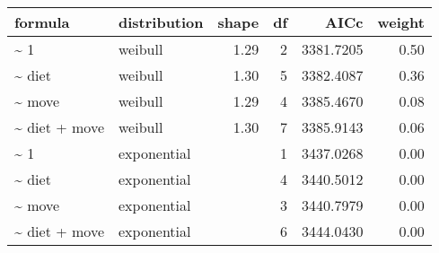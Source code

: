 \begin{table}[ht]
\centering
\begin{tabular}{llrrrr}
 formula & distribution & shape & df & AICc & weight \\ 
  \hline
\~{} 1 & weibull & 1.29 & 2 & 3381.7205 & 0.50 \\ 
  \~{} diet & weibull & 1.30 & 5 & 3382.4087 & 0.36 \\ 
  \~{} move & weibull & 1.29 & 4 & 3385.4670 & 0.08 \\ 
  \~{} diet + move & weibull & 1.30 & 7 & 3385.9143 & 0.06 \\ 
  \~{} 1 & exponential &  & 1 & 3437.0268 & 0.00 \\ 
  \~{} diet & exponential &  & 4 & 3440.5012 & 0.00 \\ 
  \~{} move & exponential &  & 3 & 3440.7979 & 0.00 \\ 
  \~{} diet + move & exponential &  & 6 & 3444.0430 & 0.00 \\ 
  \end{tabular}
\label{tab:erg}
\end{table}
